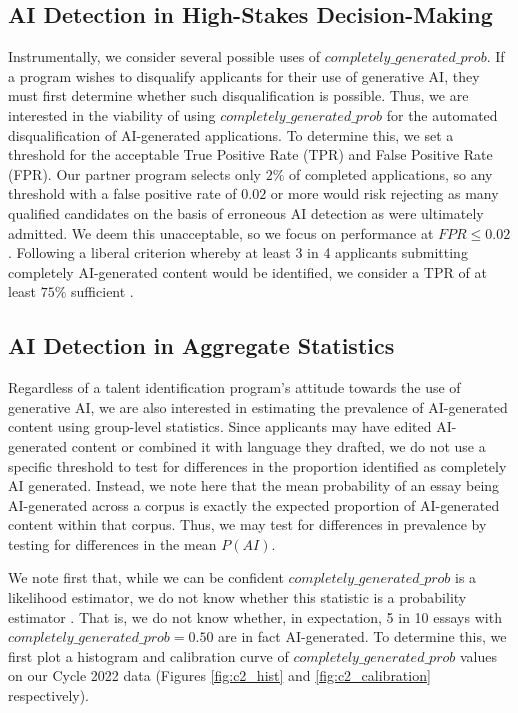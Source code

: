 \subsection{AI Detection in High-Stakes Decision-Making}\label{ssec:exp_accuracy}
Instrumentally, we consider several possible uses of $completely\_generated\_prob$. If a program wishes to disqualify applicants for their use of generative AI, they must first determine whether such disqualification is possible. Thus, we are interested in the viability of using $completely\_generated\_prob$ for the automated disqualification of AI-generated applications. To determine this, we set a threshold for the acceptable True Positive Rate (TPR) and False Positive Rate (FPR). Our partner program selects only $2\%$ of completed applications, so any threshold with a false positive rate of $0.02$ or more would risk rejecting as many qualified candidates on the basis of erroneous AI detection as were ultimately admitted. We deem this unacceptable, so we focus on performance at $FPR \leq 0.02$. Following a liberal criterion whereby at least 3 in 4 applicants submitting completely AI-generated content would be identified, we consider a TPR of at least $75\%$ sufficient \cite{Bradley_1978}.

\subsection{AI Detection in Aggregate Statistics}\label{ssec:exp_statistics}
Regardless of a talent identification program's attitude towards the use of generative AI, we are also interested in estimating the prevalence of AI-generated content using group-level statistics. Since applicants may have edited AI-generated content or combined it with language they drafted, we do not use a specific threshold to test for differences in the proportion identified as completely AI generated. Instead, we note here that the mean probability of an essay being AI-generated across a corpus is exactly the expected proportion of AI-generated content within that corpus. Thus, we may test for differences in prevalence by testing for differences in the mean $P(AI)$. 

We note first that, while we can be confident $completely\_generated\_prob$ is a likelihood estimator, we do not know whether this statistic is a probability estimator \cite{gptzero_gptzero_2023,Platt_2000}. That is, we do not know whether, in expectation, 5 in 10 essays with $completely\_generated\_prob = 0.50$ are in fact AI-generated. To determine this, we first plot a histogram and calibration curve of $completely\_generated\_prob$ values on our Cycle 2022 data (Figures \ref{fig:c2_hist} and \ref{fig:c2_calibration} respectively).

